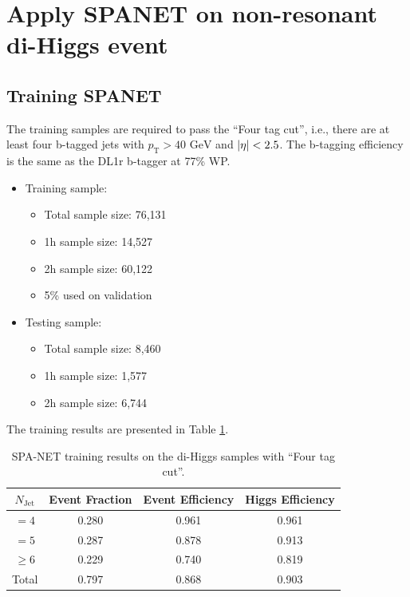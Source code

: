 \documentclass[12pt]{article}
\begin{document}
\section{Apply SPANET on non-resonant di-Higgs event}%
\label{sec:apply_spanet_on_non_resonant_di_higgs_event}
	\subsection{Training SPANET}%
	\label{sub:training_spanet}
		The training samples are required to pass the ``Four tag cut'', i.e., there are at least four b-tagged jets with $p_{\text{T}} > \text{40 GeV}$ and $\abs{\eta} < 2.5$. The b-tagging efficiency is the same as the DL1r b-tagger at 77\% WP.
		\begin{itemize}
			\item Training sample:
			\begin{itemize}
				\item Total sample size: 76,131
				\item 1h sample size: 14,527
				\item 2h sample size: 60,122			
				\item 5\% used on validation
			\end{itemize}
			\item Testing sample: 
			\begin{itemize}
				\item Total sample size: 8,460
				\item 1h sample size: 1,577
				\item 2h sample size: 6,744
			\end{itemize}
		\end{itemize}
		The training results are presented in Table \ref{tab:SPANet_diHiggs_4btag_DL1r_pt40}.
		\begin{table}[htpb]
			\centering
			\caption{SPA-NET training results on the di-Higgs samples with ``Four tag cut''.}
			\label{tab:SPANet_diHiggs_4btag_DL1r_pt40}
			\begin{tabular}{c|c|cc}
				$N_\text{Jet}$ & Event Fraction & Event Efficiency & Higgs Efficiency \\
				\hline
				$=4$	  &   0.280             &    0.961              &    0.961             \\
				$=5$	  &   0.287             &    0.878              &    0.913             \\
				$\ge 6$	  &   0.229             &    0.740              &    0.819             \\
				Total	  &   0.797             &    0.868              &    0.903             \\
			\end{tabular}
		\end{table}
\end{document}
